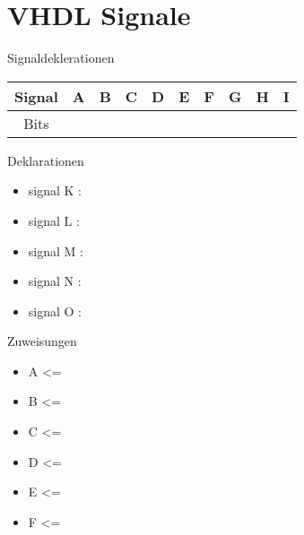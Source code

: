 \documentclass[
  german,            %
  aspectratio=169,    %
  sectionpage=false,   %
]{tumbeamer}
\begin{document}
\section{VHDL Signale}
\begin{frame}{Signaldeklerationen}
	\centering
	\begin{tabular}[t]{c|ccccccccc}
		Signal     & A    & B    & C    & D    & E    & F    & G    & H    & I \\
		\hline
		Bits    &     &     &     &     &     & &     &     &  \\
	\end{tabular}
\end{frame}
\begin{frame}{Deklarationen}
	\begin{itemize}
		\item signal K : 
		\item signal L :
		\item signal M :
		\item signal N :
		\item signal O :
	\end{itemize}
\end{frame}
\begin{frame}{Zuweisungen}
	\begin{itemize}
		\item A <=
		\item B <=
		\item C <=
		\item D <=
		\item E <=
		\item F <= 
	\end{itemize}
\end{frame}
\end{document}
